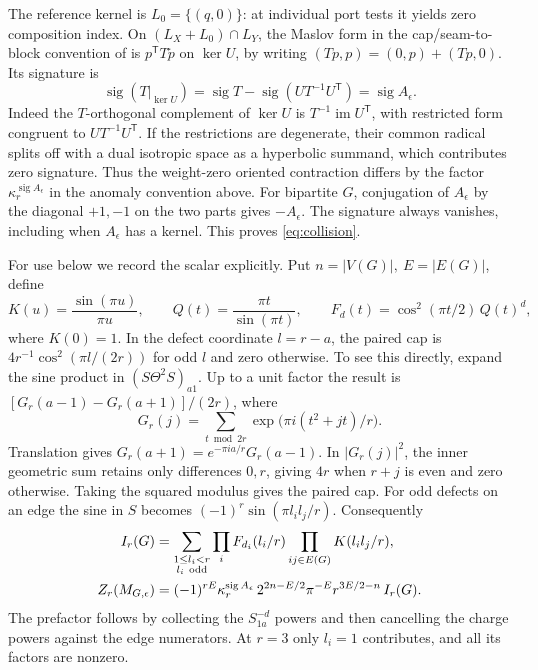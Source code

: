 \documentclass[11pt]{article}
\theoremstyle{remark}
\DeclareMathOperator{\sig}{sig}
\begin{document}
The reference kernel is \(L_0=\{(q,0)\}\): at individual port tests it yields zero composition index. On \((L_X+L_0)\cap L_Y\), the Maslov form in the cap/seam-to-block convention of \cite[Section~2]{P50} is \(p^{\mathsf T}T\widetilde p\) on \(\ker U\), by writing \((Tp,p)=(0,p)+(Tp,0)\). Its signature is
\[
       \sig(T|_{\ker U})=\sig T-\sig(UT^{-1}U^{\mathsf T})
                        =\sig A_\epsilon .
\]
Indeed the \(T\)-orthogonal complement of \(\ker U\) is \(T^{-1}\operatorname{im}U^{\mathsf T}\), with restricted form congruent to \(UT^{-1}U^{\mathsf T}\). If the restrictions are degenerate, their common radical splits off with a dual isotropic space as a hyperbolic summand, which contributes zero signature. Thus the weight-zero oriented contraction differs by the factor \(\kappa_r^{\sig A_\epsilon}\) in the anomaly convention above. For bipartite \(G\), conjugation of \(A_\epsilon\) by the diagonal \(+1,-1\) on the two parts gives \(-A_\epsilon\). The signature always vanishes, including when \(A_\epsilon\) has a kernel. This proves \eqref{eq:collision}.

For use below we record the scalar explicitly. Put \(n=|V(G)|,\ E=|E(G)|\), define
\[
 K(u)=\frac{\sin(\pi u)}{\pi u},\qquad
 Q(t)=\frac{\pi t}{\sin(\pi t)},\qquad
 F_d(t)=\cos^2(\pi t/2)\,Q(t)^d ,
\]
where \(K(0)=1\). In the defect coordinate \(l=r-a\), the paired cap is \(4r^{-1}\cos^2(\pi l/(2r))\) for odd \(l\) and zero otherwise. To see this directly, expand the sine product in \((S\Theta^2S)_{a1}\). Up to a unit factor the result is
\([G_r(a-1)-G_r(a+1)]/(2r)\), where
\[
 G_r(j)=\sum_{t\bmod 2r}\exp\!\bigl(\pi i(t^2+jt)/r\bigr).
\]
Translation gives \(G_r(a+1)=e^{-\pi i a/r}G_r(a-1)\).
In \(|G_r(j)|^2\), the inner geometric sum retains only differences \(0,r\), giving \(4r\) when \(r+j\) is even and zero otherwise. Taking the squared modulus gives the paired cap. For odd defects on an edge the sine in \(S\) becomes \((-1)^r\sin(\pi l_il_j/r)\). Consequently
\begin{align}
 I_r(G)&=\sum_{\substack{1\le l_i<r\\l_i\ {\rm odd}}}
 \prod_iF_{d_i}(l_i/r)\prod_{ij\in E(G)}K(l_i l_j/r),\label{eq:charge}\\
 Z_r(M_{G,\epsilon})&=
 (-1)^{rE}\kappa_r^{\sig A_\epsilon}\,
 2^{2n-E/2}\pi^{-E} r^{3E/2-n}\,I_r(G).\label{eq:phase}
\end{align}
The prefactor follows by collecting the \(S_{1a}^{-d}\) powers and then cancelling the charge powers against the edge numerators. At \(r=3\) only \(l_i=1\) contributes, and all its factors are nonzero.
\end{document}
